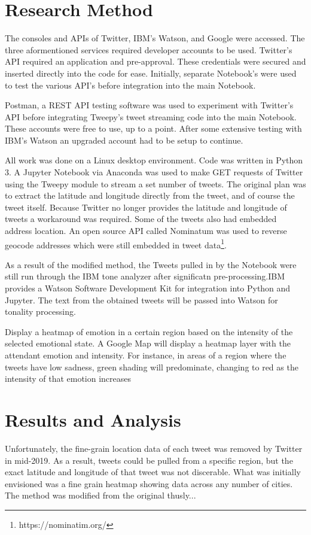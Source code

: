 \documentclass[12pt, oneside]{article}
\begin{document}
\section{Research Method}

The consoles and APIs of Twitter, IBM's Watson, and Google were
accessed. The three aformentioned services required developer accounts to be
used. Twitter's API required an application and pre-approval. These
credentials were secured and inserted directly into the code for ease.
Initially, separate Notebook's were used to test the various API's before
integration into the main Notebook.

Postman, a REST API testing software was used to experiment with Twitter's
API\cite{Postman} before integrating Tweepy's tweet streaming code into the main Notebook. These accounts were free to use, up to a point. After some 
extensive testing with IBM's Watson an
upgraded account had to be setup to continue.

All work was done on a Linux desktop environment. Code was written in Python
3. A Jupyter Notebook via Anaconda was used to make GET requests of Twitter
using the Tweepy module to stream a set number of tweets. The original plan was
to extract the latitude and longitude directly from the tweet, and of course
the tweet itself. Because Twitter no longer provides the latitude and
longitude of tweets a workaround was required. Some of the tweets also had
embedded address location. An open source API called Nominatum was used to
reverse geocode addresses which were
still embedded in tweet data\footnote{https://nominatim.org/}.


As a result of the modified method, the Tweets pulled in by the Notebook were
still run through the IBM tone analyzer after significatn pre-processing.IBM provides a Watson Software
Development Kit for integration into Python and Jupyter. The text from the
obtained tweets will be passed into Watson for tonality processing.

Display a heatmap of emotion in a certain region based on the intensity
of the selected emotional state. A Google
Map will display a heatmap layer with the attendant emotion and intensity. For
instance, in areas of a region where the tweets have low sadness, green shading
will predominate, changing to red as the intensity of that emotion increases


\section{Results and Analysis}
Unfortunately, the fine-grain location data of
each tweet was removed by Twitter in mid-2019. As a result, tweets could be
pulled from a specific region, but the exact latitude and longitude of that
tweet was not discerable. What was initially envisioned was a fine grain heatmap
showing data across any number of cities. The method was modified from the original thusly...
\end{document}
